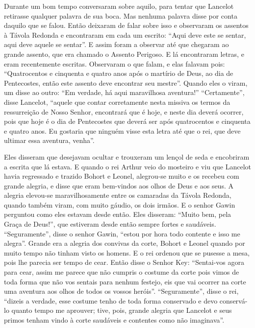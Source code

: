 Durante um bom tempo conversaram sobre aquilo, para tentar que Lancelot
retirasse qualquer palavra de sua boca. Mas nenhuma palavra disse por conta
daquilo que se falou. Então deixaram de falar sobre isso e observaram os
assentos à Távola Redonda e encontraram em cada um escrito: “Aqui deve este se
sentar, aqui deve aquele se sentar”. E assim foram a observar até que chegaram
ao grande assento, que era chamado o Assento Perigoso. E lá encontraram letras,
e eram recentemente escritas. Observaram o que falam, e elas falavam pois: 
“Quatrocentos e cinquenta e quatro anos após o martírio de Deus, ao dia de
Pentecostes, então este assento deve encontrar seu mestre”. Quando eles o
viram, um disse ao outro: “Em verdade, há aqui maravilhosa aventura!”
“Certamente”, disse Lancelot, “aquele que contar corretamente nesta missiva os
termos da ressurreição de Nosso Senhor, encontrará que é hoje, e neste dia
deverá ocorrer, pois que hoje é o dia de Pentecostes que deverá ser após
quatrocentos e cinquenta e quatro anos. Eu gostaria que ninguém visse esta
letra até que o rei, que deve ultimar essa aventura, venha”. 

Eles disseram que desejavam ocultar e trouxeram um lençol de seda e encobriram a
escrita que lá estava. E quando o rei Arthur veio do mosteiro e viu que
Lancelot havia regressado e trazido Bohort e Leonel, alegrou-se muito e os
recebeu com grande alegria, e disse que eram bem-vindos aos olhos de Deus e aos
seus. A alegria elevou-se maravilhosamente entre os camaradas da Távola
Redonda, quando também viram, com muito gáudio, os dois irmãos. E o senhor
Gawin perguntou como eles estavam desde então. Eles disseram: “Muito bem, pela
Graça de Deus!”, que estiveram desde então sempre fortes e saudáveis.
“Seguramente”, disse o senhor Gawin, “estou por hora todo contente e isso me
alegra”. Grande era a alegria dos convivas da corte, Bohort e Leonel quando por
muito tempo não tinham visto os homens. E o rei ordenou que se pusesse a mesa,
pois lhe parecia ser tempo de cear. Então disse o Senhor Key: “Sentai-vos agora
para cear, assim me parece que não cumpris o costume da corte pois vimos de
toda forma que não vos sentais para nenhum festejo, eis que vai ocorrer na
corte uma aventura aos olhos de todos os vossos heróis”. “Seguramente”, disse o
rei, “dizeis a verdade, esse costume tenho de toda forma conservado e devo
conservá-lo quanto tempo me aprouver; tive, pois, grande alegria que Lancelot
e seus primos tenham vindo à corte saudáveis e contentes como não imaginava”. 

